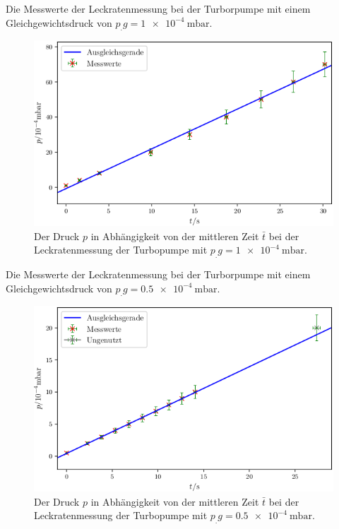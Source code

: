 \newpage
\begin{table}
\centering
\caption{Die Messwerte der Leckratenmessung bei der Turborpumpe mit einem Gleichgewichtsdruck von $p_.g = \SI{1e-4}{\milli\bar}$.}

\label{tab:TL3}
\end{table}

\begin{figure}
\centering
\includegraphics[width=\linewidth-70pt,height=\textheight-70pt,keepaspectratio]{content/images/TL3.png}
\caption{Der Druck $p$ in Abhängigkeit von der mittleren Zeit $\bar{t}$ bei der Leckratenmessung der Turbopumpe  mit $p_.g = \SI{1e-4}{\milli\bar}$.}
\label{fig:TL3}
\end{figure}

\begin{table}
\centering
\caption{Die Messwerte der Leckratenmessung bei der Turborpumpe mit einem Gleichgewichtsdruck von $p_.g = \SI{0.5e-4}{\milli\bar}$.}

\label{tab:TL4}
\end{table}

\begin{figure}
\centering
\includegraphics[width=\linewidth-70pt,height=\textheight-70pt,keepaspectratio]{content/images/TL4.png}
\caption{Der Druck $p$ in Abhängigkeit von der mittleren Zeit $\bar{t}$ bei der Leckratenmessung der Turbopumpe  mit $p_.g = \SI{0.5e-4}{\milli\bar}$.}
\label{fig:TL4}
\end{figure}

